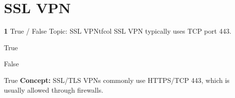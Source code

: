 \documentclass[10pt,a4paper]{article}
\begin{document}
\section{SSL VPN}
\begin{qcard}{\color{white}\textbf{1} \hfill \small True / False \textbar{} Topic: SSL VPN}{tfcol}
SSL VPN typically uses TCP port 443.

\begin{qoptions}
\item True
\item False
\end{qoptions}
\begin{explainbox}{True}
\textbf{Concept:} SSL/TLS VPNs commonly use HTTPS/TCP 443, which is usually allowed through firewalls.
\end{explainbox}
\end{qcard}
\end{document}
